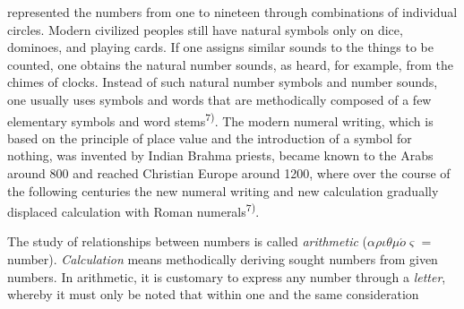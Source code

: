 \thispagestyle{fancy}

\vspace{0.5cm}

represented the numbers from one to nineteen through combinations of individual circles. Modern civilized peoples still have natural symbols only on dice, dominoes, and playing cards. If one assigns similar sounds to the things to be counted, one obtains the natural number sounds, as heard, for example, from the chimes of clocks. Instead of such natural number symbols and number sounds, one usually uses symbols and words that are methodically composed of a few elementary symbols and word stems\textsuperscript{7)}. The modern numeral writing, which is based on the principle of place value and the introduction of a symbol for nothing, was invented by Indian Brahma priests, became known to the Arabs around 800 and reached Christian Europe around 1200, where over the course of the following centuries the new numeral writing and new calculation gradually displaced calculation with Roman numerals\textsuperscript{7)}. 

The study of relationships between numbers is called \textit{arithmetic} ($\alpha\rho\iota\theta\mu\acute{o}\varsigma$ = number). \textit{Calculation} means methodically deriving sought numbers from given numbers. In arithmetic, it is customary to express any number through a \textit{letter}, whereby it must only be noted that within one and the same consideration

